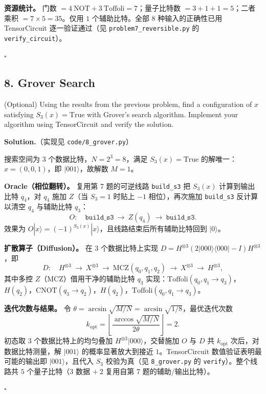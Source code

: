 \documentclass{ctexart}
\newcommand{\ket}[1]{|#1\rangle}
\newcommand{\bra}[1]{\langle #1|}
\begin{document}
\textbf{资源统计。} 门数 $=4\ \text{NOT}+3\ \text{Toffoli}=7$；量子比特数 $=3+1+1=5$；二者乘积 $=7\times5=35$。仅用 $1$ 个辅助比特。全部 $8$ 种输入的正确性已用 TensorCircuit 逐一验证通过（见 \texttt{problem7\_reversible.py} 的 \texttt{verify\_circuit}）。

\hfill $\square$

\subsection*{8. Grover Search}
(Optional) Using the results from the previous problem, find a configuration of $x$ satisfying $S_3(x) = \text{True}$ with Grover's search algorithm. Implement your algorithm using TensorCircuit and verify the solution.

\medskip
\noindent\textbf{Solution.}（实现见 \texttt{code/8\_grover.py}）

搜索空间为 $3$ 个数据比特，$N=2^3=8$，满足 $S_3(x)=\text{True}$ 的解唯一：$x=(0,0,1)$，即 $\ket{001}$，故解数 $M=1$。

\textbf{Oracle（相位翻转）。} 复用第 7 题的可逆线路 \texttt{build\_s3} 把 $S_3(x)$ 计算到输出比特 $q_4$，对 $q_4$ 施加 $Z$（当 $S_3=1$ 时贴上 $-1$ 相位），再次施加 \texttt{build\_s3} 反计算以清空 $q_4$ 与辅助比特 $q_3$：
\begin{equation*}
    O:\quad \texttt{build\_s3}\ \to\ Z(q_4)\ \to\ \texttt{build\_s3}.
\end{equation*}
效果为 $O\ket{x}=(-1)^{S_3(x)}\ket{x}$，且线路结束后所有辅助比特回到 $\ket{0}$。

\textbf{扩散算子（Diffusion）。} 在 $3$ 个数据比特上实现 $D=H^{\otimes3}(2\ket{000}\!\bra{000}-I)H^{\otimes3}$，即
\begin{equation*}
    D:\quad H^{\otimes3}\ \to\ X^{\otimes3}\ \to\ \mathrm{MCZ}(q_0,q_1,q_2)\ \to\ X^{\otimes3}\ \to\ H^{\otimes3},
\end{equation*}
其中多控 $Z$（MCZ）借用干净的辅助比特 $q_3$ 实现：$\mathrm{Toffoli}(q_0,q_1\to q_3)$，$H(q_2)$，$\mathrm{CNOT}(q_3\to q_2)$，$H(q_2)$，$\mathrm{Toffoli}(q_0,q_1\to q_3)$。

\textbf{迭代次数与结果。} 令 $\theta=\arcsin\sqrt{M/N}=\arcsin\sqrt{1/8}$，最优迭代次数
\begin{equation*}
    k_{\text{opt}}=\left\lfloor \frac{\arccos\sqrt{M/N}}{2\theta}\right\rfloor=2 .
\end{equation*}
初态取 $3$ 个数据比特上的均匀叠加 $H^{\otimes3}\ket{000}$，交替施加 $O$ 与 $D$ 共 $k_{\text{opt}}$ 次后，对数据比特测量，解 $\ket{001}$ 的概率显著放大到接近 $1$。TensorCircuit 数值验证表明最可能的输出即 $\ket{001}$，且代入 $S_3$ 校验为真（见 \texttt{8\_grover.py} 的 \texttt{verify}）。整个线路共 $5$ 个量子比特（$3$ 数据 $+\ 2$ 复用自第 7 题的辅助/输出比特）。

\hfill $\square$
\end{document}
